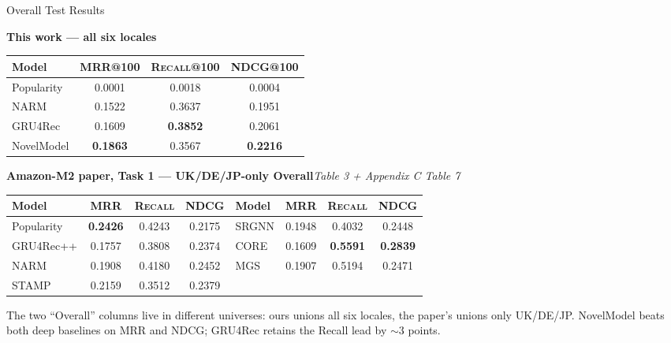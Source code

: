 \documentclass[10pt,aspectratio=169]{beamer}
\newcommand{\metric}[1]{\textsc{#1}}
\newcommand{\best}[1]{\textbf{#1}}
\begin{document}
\begin{frame}{Overall Test Results}
  \begin{center}
  {\scriptsize\textbf{This work --- all six locales}}\\[0.25em]
  \scriptsize
  \begin{tabular}{lccc}
    \toprule
    Model & \metric{MRR@100} & \metric{Recall@100} & \metric{NDCG@100} \\
    \midrule
    Popularity & 0.0001 & 0.0018 & 0.0004 \\
    NARM       & 0.1522 & 0.3637 & 0.1951 \\
    GRU4Rec    & 0.1609 & \best{0.3852} & 0.2061 \\
    NovelModel & \best{0.1863} & 0.3567 & \best{0.2216} \\
    \bottomrule
  \end{tabular}
  \end{center}

  \vspace{0.6em}
  \begin{center}
  {\scriptsize\textbf{Amazon-M2 paper, Task 1 --- UK/DE/JP-only Overall}\quad\textit{\footnotesize Table 3 + Appendix C Table 7}}\\[0.25em]
  \scriptsize
  \begin{tabular}{lccc@{\hskip 1.6em}lccc}
    \toprule
    Model & \metric{MRR} & \metric{Recall} & \metric{NDCG} & Model & \metric{MRR} & \metric{Recall} & \metric{NDCG} \\
    \midrule
    Popularity & \best{0.2426} & 0.4243 & 0.2175 & SRGNN & 0.1948 & 0.4032 & 0.2448 \\
    GRU4Rec++  & 0.1757 & 0.3808 & 0.2374 & CORE  & 0.1609 & \best{0.5591} & \best{0.2839} \\
    NARM       & 0.1908 & 0.4180 & 0.2452 & MGS   & 0.1907 & 0.5194 & 0.2471 \\
    STAMP      & 0.2159 & 0.3512 & 0.2379 &       &        &        &        \\
    \bottomrule
  \end{tabular}
  \end{center}

  \vspace{0.4em}
  \footnotesize The two ``Overall'' columns live in different universes: ours unions all six locales, the paper's unions only UK/DE/JP. NovelModel beats both deep baselines on MRR and NDCG; GRU4Rec retains the Recall lead by ${\sim}3$ points.
\end{frame}
\end{document}
